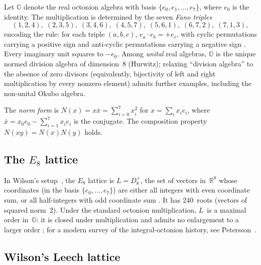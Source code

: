 \documentclass[twoside,english]{paper}
\numberwithin{equation}{section}
\numberwithin{figure}{section}
\theoremstyle{definition}
\theoremstyle{remark}
\newcommand{\OO}{\mathbb{O}}          %
\newcommand{\RR}{\mathbb{R}}
\newcommand{\Nrm}{N}                  %
\begin{document}
Let $\OO$ denote the real octonion algebra with basis
$\{e_0, e_1, \ldots, e_7\}$, where $e_0$ is the identity.
The multiplication is determined by the seven \emph{Fano triples}
\begin{equation}\label{eq:fano}
  (1,2,4),\; (2,3,5),\; (3,4,6),\; (4,5,7),\; (5,6,1),\;
  (6,7,2),\; (7,1,3),
\end{equation}
encoding the rule: for each triple $(a,b,c)$,
$e_a \cdot e_b = +e_c$, with cyclic permutations carrying a positive
sign and anti-cyclic permutations carrying a negative sign
\cite{Baez2002}.  Every imaginary unit squares to $-e_0$.  Among
\emph{unital} real algebras, $\OO$ is the unique normed division
algebra of dimension~8 (Hurwitz); relaxing ``division algebra'' to
the absence of zero divisors (equivalently, bijectivity of left and
right multiplication by every nonzero element) admits further
examples, including the non-unital Okubo algebra.

The \emph{norm form} is $\Nrm(x) = x \bar{x} = \sum_{i=0}^7 x_i^2$
for $x = \sum_i x_i e_i$, where $\bar{x} = x_0 e_0 - \sum_{i=1}^7
x_i e_i$ is the conjugate.  The composition property
$\Nrm(xy) = \Nrm(x)\Nrm(y)$ holds.

\subsection{The $E_8$ lattice}

In Wilson's setup~\cite{Wilson2009}, the $E_8$ lattice is
$L = D_8^+$, the set of vectors in~$\RR^8$ whose coordinates (in the
basis $\{e_0, \ldots, e_7\}$) are either all integers with even
coordinate sum, or all half-integers with odd coordinate sum
\cite{ConwaySmith2003}.  It has
240~roots (vectors of squared norm~2).  Under the standard octonion
multiplication, $L$~is a maximal order in~$\OO$: it is closed under
multiplication and admits no enlargement to a larger order
\cite{Coxeter1946, ConwaySmith2003}; for a modern survey of the
integral-octonion history, see Petersson~\cite{Petersson2018}.

\subsection{Wilson's Leech lattice}\label{subsec:wilson-leech}
\end{document}
